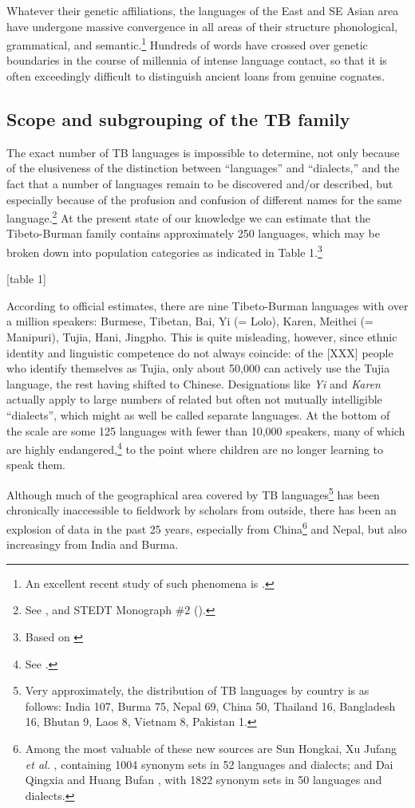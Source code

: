 Whatever their genetic affiliations, the languages of the East and SE Asian area have undergone massive convergence in all areas of their structure  phonological, grammatical, and semantic.\footnote{An excellent recent study of such phenomena is \citealt{TK-LCCGL}.}  Hundreds of words have crossed over genetic boundaries in the course of millennia of intense language contact, so that it is often exceedingly difficult to distinguish ancient loans from genuine cognates.

\subsection{Scope and subgrouping of the TB family}

The exact number of TB languages is impossible to determine, not only because of the elusiveness of the distinction between “languages” and “dialects,” and the fact that a number of languages remain to be discovered and/or described, but especially because of the profusion and confusion of different names for the same language.\footnote{See \citealt{JAM-LDTB}, and STEDT Monograph \#2 (\citealt{JAM-LDTB2}).} At the present state of our knowledge we can estimate that the Tibeto-Burman family contains approximately 250 languages, which may be broken down into population categories as indicated in Table 1.\footnote{Based on \citealt{LSF-ELW17}}

[table 1]

According to official estimates, there are nine Tibeto-Burman languages with over a million speakers: Burmese, Tibetan, Bai, Yi (= Lolo), Karen, Meithei (= Manipuri), Tujia, Hani, Jingpho. This is quite misleading, however, since ethnic identity and linguistic competence do not always coincide: of the [XXX] people who identify themselves as Tujia, only about 50,000 can actively use the Tujia language, the rest having shifted to Chinese. Designations like {\it Yi} and {\it Karen} actually apply to large numbers of related but often not mutually intelligible “dialects”, which might as well be called separate languages. At the bottom of the scale are some 125 languages with fewer than 10,000 speakers, many of which are highly endangered,\footnote{See \citealt{JAM-ELMSEA}.} to the point where children are no longer learning to speak them.

Although much of the geographical area covered by TB languages\footnote{Very approximately, the distribution of TB languages by country is as follows: India 107, Burma 75, Nepal 69, China 50, Thailand 16, Bangladesh 16, Bhutan 9, Laos 8, Vietnam 8, Pakistan 1.} has been chronically inaccessible to fieldwork by scholars from outside, there has been an explosion of data in the past 25 years, especially from China\footnote{Among the most valuable of these new sources are Sun Hongkai, Xu Jufang {\it et al.} \citeyearpar{ZMYYC}, containing 1004 synonym sets in 52 languages and dialects; and Dai Qingxia and Huang Bufan \citeyearpar{TBL}, with 1822 synonym sets in 50 languages and dialects.} and Nepal, but also increasingy from India and Burma.

